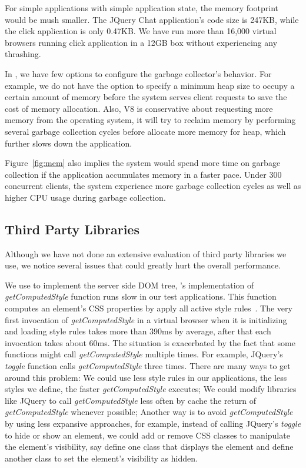 For simple applications with simple application state, the memory footprint would be mush smaller.
The JQuery Chat application's code size is 247KB, while the click application is only 0.47KB.
We have run more than 16,000 virtual browsers running click application in a 12GB box without
experiencing any thrashing.

In \nodejs{}, we have few options to configure the garbage collector's behavior.
For example, we do not have the option to specify a minimum heap size to
occupy a certain amount of memory before the system serves client requests
to save the cost of memory allocation.
Also, V8 is conservative about requesting more memory from the operating system, %
it will try to reclaim memory by performing several garbage collection cycles before
allocate more memory for heap, %
which further slows down the application.

Figure~\ref{fig:mem} also implies the system would spend more time on garbage collection if
the application accumulates memory in a faster pace.
Under 300 concurrent clients, the system experience more garbage collection cycles as
well as higher CPU usage during garbage collection.


\subsection{Third Party Libraries}
Although we have not done an extensive evaluation of third party libraries we use,
we notice several issues that could greatly hurt the overall performance.

We use \jsdom{} to implement the server side DOM tree,
\jsdom{}'s implementation of \emph{getComputedStyle} function runs slow in our test applications.
This function computes an element's CSS properties by apply all active style rules~\cite{wilson2000document}.
The very first invocation of \emph{getComputedStyle} in a virtual browser when it
is initializing and loading style rules takes more than 390ms by average,
after that each invocation takes about 60ms.
The situation is exacerbated by the fact that some functions might call \emph{getComputedStyle}
multiple times.
For example, JQuery's \emph{toggle} function calls \emph{getComputedStyle} three times.
There are many ways to get around this problem:
We could use less style rules in our applications, the less styles we define,
the faster \emph{getComputedStyle} executes;
We could modify libraries like JQuery to call \emph{getComputedStyle} less often
by cache the return of \emph{getComputedStyle} whenever possible;
Another way is to avoid \emph{getComputedStyle} by using less expansive approaches, for example,
instead of calling JQuery's \emph{toggle} to hide or show an element,
we could add or remove CSS classes to manipulate the element's visibility,
say define one class that displays the element and define another class to set the element's visibility
as hidden.




